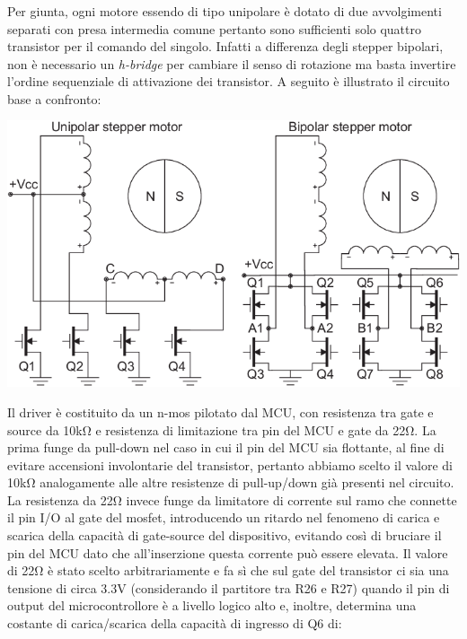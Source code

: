 \hypertarget{section-4}{%
\subsubsection{}\label{section-4}}

Per giunta, ogni motore essendo di tipo unipolare è dotato di due
avvolgimenti separati con presa intermedia comune pertanto sono
sufficienti solo quattro transistor per il comando del singolo. Infatti
a differenza degli stepper bipolari, non è necessario un \emph{h-bridge}
per cambiare il senso di rotazione ma basta invertire l'ordine
sequenziale di attivazione dei transistor. A seguito è illustrato il
circuito base a confronto:

\begin{center}
\includegraphics[scale=0.6]{figures/image75.png}
\captionsetup{type=figure}
\end{center}

Il driver è costituito da un n-mos pilotato dal MCU, con resistenza tra gate e source da 10kΩ 
e resistenza di limitazione tra pin del MCU e gate da 22Ω. 
La prima funge da pull-down nel caso in cui il pin
del MCU sia flottante, al fine di evitare accensioni involontarie del
transistor, pertanto abbiamo scelto il valore di 10kΩ analogamente alle
altre resistenze di pull-up/down già presenti nel circuito. La
resistenza da 22Ω invece funge da limitatore di corrente sul ramo che connette il pin I/O al
gate del mosfet, introducendo un ritardo nel fenomeno di carica e scarica
della capacità di gate-source del dispositivo, evitando così di bruciare
il pin del MCU dato che all'inserzione questa corrente può essere
elevata. Il valore di 22Ω è stato scelto arbitrariamente e fa sì che sul
gate del transistor ci sia una tensione di circa 3.3V (considerando il
partitore tra R26 e R27) quando il pin di output del microcontrollore è
a livello logico alto e, inoltre, determina una costante di
carica/scarica della capacità di ingresso di Q6 di:

